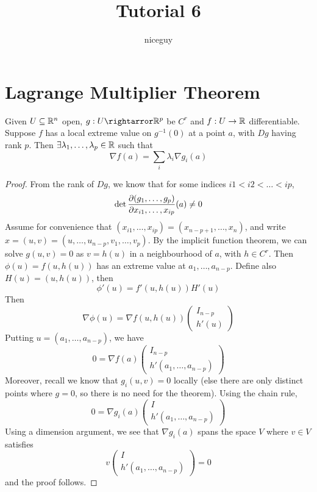 \documentclass[12pt]{article}
\title{Tutorial  6}
\author{niceguy}
\begin{document}
\maketitle

\section{Lagrange Multiplier Theorem}

Given $U \subseteq \mathbb{R}^n$ open, $g: U \rightarror \R^p$ be $C^r$ and $f: U \rightarrow \mathbb{R}$ differentiable. Suppose $f$ has a local extreme value on $g^{-1}(0)$ at a point $a$, with $Dg$ having rank $p$. Then $\exists \lambda_1,\dots,\lambda_p \in \mathbb{R}$ such that
$$\nabla f(a) = \sum_i \lambda_i \nabla g_i(a)$$

\begin{proof}
    From the rank of $Dg$, we know that for some indices $i1 < i2 < \dots < ip$,
    $$\det\frac{\partial (g_1,\dots,g_p)}{\partial x_{i1},\dots,x_{ip}}(a) \neq 0$$
    Assume for convenience that $(x_{i1},\dots,x_{ip}) = (x_{n-p+1},\dots,x_n)$, and write $x = (u,v) = (u,\dots,u_{n-p},v_1,\dots,v_p)$. By the implicit function theorem, we can solve $g(u,v) = 0$ as $v = h(u)$ in a neighbourhood of $a$, with $h \in C^r$. Then $\phi(u) = f(u,h(u))$ has an extreme value at $a_1,\dots,a_{n-p}$. Define also $H(u) = (u,h(u))$, then
    $$\phi'(u) = f'(u,h(u))H'(u)$$
    Then
    $$\nabla\phi(u) = \nabla f(u,h(u)) \begin{pmatrix} I_{n-p} \\ h'(u) \end{pmatrix}$$
    Putting $u = (a_1,\dots,a_{n-p})$, we have
    $$0 = \nabla f(a) \begin{pmatrix} I_{n-p} \\ h'(a_1,\dots,a_{n-p})\end{pmatrix}$$
    Moreover, recall we know that $g_i(u,v) = 0$ locally (else there are only distinct points where $g = 0$, so there is no need for the theorem). Using the chain rule,
    $$0 = \nabla g_i(a) \begin{pmatrix} I \\ h'(a_1,\dots,a_{n-p})\end{pmatrix}$$
    Using a dimension argument, we see that $\nabla g_i(a)$ spans the space $V$ where $v \in V$ satisfies
    $$v \begin{pmatrix} I \\ h'(a_1,\dots,a_{n-p}) \end{pmatrix} = 0$$
    and the proof follows.
\end{proof}
\end{document}
